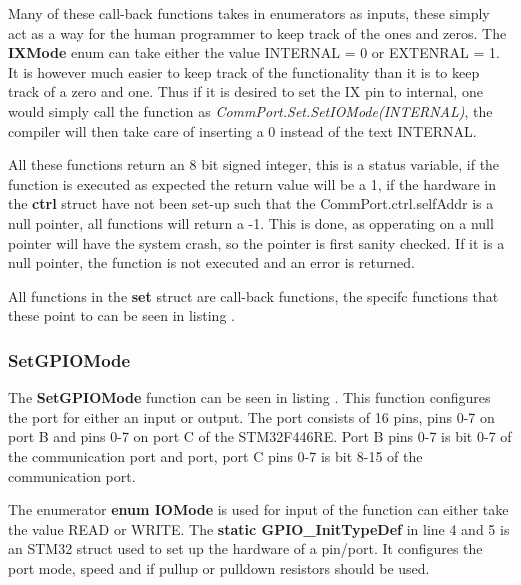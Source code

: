 Many of these call-back functions takes in enumerators as inputs, these simply act as a way for the human programmer to keep track of the ones and zeros. The \textbf{IXMode} enum can take either the value INTERNAL = 0 or EXTENRAL = 1. It is however much easier to keep track of the functionality than it is to keep track of a zero and one. Thus if it is desired to set the IX pin to internal, one would simply call the function as \textit{CommPort.Set.SetIOMode(INTERNAL)}, the compiler will then take care of inserting a 0 instead of the text INTERNAL. 

All these functions return an 8 bit signed integer, this is a status variable, if the function is executed as expected the return value will be a 1, if the hardware in the \textbf{ctrl} struct have not been set-up such that the CommPort.ctrl.selfAddr is a null pointer, all functions will return a -1. This is done, as opperating on a null pointer will have the system crash, so the pointer is first sanity checked. If it is a null pointer, the function is not executed and an error is returned.

All functions in the \textbf{set} struct are call-back functions, the specifc functions that these point to can be seen in listing .


\subsubsection*{SetGPIOMode}
The \textbf{SetGPIOMode} function can be seen in listing . This function configures the port for either an input or output. The port consists of 16 pins, pins 0-7 on port B and pins 0-7 on port C of the STM32F446RE. Port B pins 0-7 is bit 0-7 of the communication port and port, port C pins 0-7 is bit 8-15 of the communication port.


The enumerator \textbf{enum IOMode} is used for input of the function can either take the value READ or WRITE. The \textbf{static GPIO\_InitTypeDef} in line 4 and 5 is an STM32 struct used to set up the hardware of a pin/port. It configures the port mode, speed and if pullup or pulldown resistors should be used.

